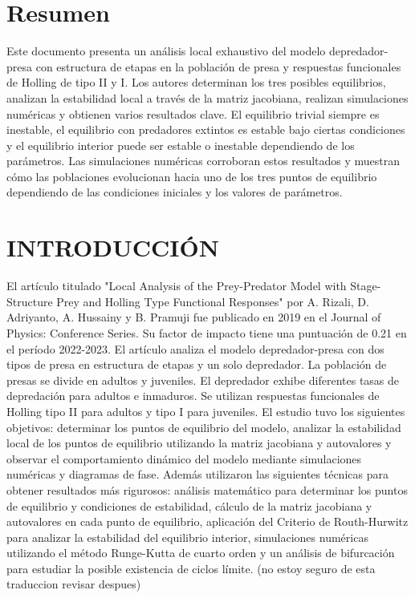 \documentclass{wscpaperproc}
\theoremstyle{wsc}
\begin{document}
\maketitle

\section*{Resumen}
Este documento presenta un análisis local exhaustivo del modelo depredador-presa con estructura de 
etapas en la población de presa y respuestas funcionales de Holling de tipo II y I. Los autores determinan 
los tres posibles equilibrios, analizan la estabilidad local a través de la matriz jacobiana, realizan 
simulaciones numéricas y obtienen varios resultados clave. El equilibrio trivial siempre es inestable, 
el equilibrio con predadores extintos es estable bajo ciertas condiciones y el equilibrio interior puede 
ser estable o inestable dependiendo de los parámetros. Las simulaciones numéricas corroboran estos resultados 
y muestran cómo las poblaciones evolucionan hacia uno de los tres puntos de equilibrio dependiendo de las 
condiciones iniciales y los valores de parámetros.  

\section{INTRODUCCI\'ON}
\label{sec:intro}
El artículo titulado "Local Analysis of the Prey-Predator Model with Stage-Structure Prey and Holling 
Type Functional Responses" por A. Rizali, D. Adriyanto, A. Hussainy y B. Pramuji fue publicado en 2019 
en el Journal of Physics: Conference Series. Su factor de impacto tiene una puntuaci\'on de 0.21 en el 
período 2022-2023. El artículo analiza el modelo depredador-presa con dos tipos de presa en estructura 
de etapas y un solo depredador. La población de presas se divide en adultos y juveniles. El depredador 
exhibe diferentes tasas de depredación para adultos e inmaduros. Se utilizan respuestas funcionales de 
Holling tipo II para adultos y tipo I para juveniles. El estudio tuvo los siguientes objetivos:
determinar los puntos de equilibrio del modelo, analizar la estabilidad local de los puntos de equilibrio 
utilizando la matriz jacobiana y autovalores y observar el comportamiento dinámico del modelo mediante 
simulaciones numéricas y diagramas de fase. Además utilizaron las siguientes técnicas para obtener resultados
más rigurosos: análisis matemático para determinar los puntos de equilibrio y condiciones de estabilidad, 
cálculo de la matriz jacobiana y autovalores en cada punto de equilibrio, aplicación del Criterio de Routh-Hurwitz 
para analizar la estabilidad del equilibrio interior, simulaciones numéricas utilizando el método Runge-Kutta de 
cuarto orden y un análisis de bifurcación para estudiar la posible existencia de ciclos límite. (no estoy seguro de esta traduccion revisar despues)
\end{document}

